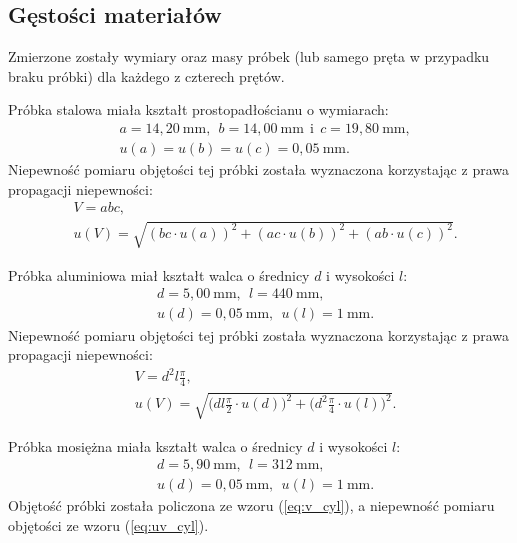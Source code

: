 \documentclass[12pt,a4paper]{article}
\numberwithin{equation}{section}
\begin{document}
\subsection{Gęstości materiałów}

Zmierzone zostały wymiary oraz masy próbek (lub samego pręta w przypadku braku próbki) dla każdego z czterech prętów.

Próbka stalowa miała kształt prostopadłościanu o wymiarach:
\begin{equation}
	\begin{split}
	 	&a = 14,20~\textrm{mm},~~b = 14,00~\textrm{mm}~~\textrm{i}~~c = 19,80~\textrm{mm}, \\
		&u(a) = u(b) = u(c) = 0,05~\textrm{mm}.
	\end{split}
\end{equation}
Niepewność pomiaru objętości tej próbki została wyznaczona korzystając z prawa propagacji niepewności:
\begin{align}
	&V = abc, \\
	&u(V) = \sqrt{(bc\cdot u(a))^2 + (ac\cdot u(b))^2 + (ab\cdot u(c))^2}.
\end{align}

Próbka aluminiowa miał kształt walca o średnicy $d$ i wysokości $l$:
\begin{equation}
	\begin{split}
		&d = 5,00~\textrm{mm},~~l = 440~\textrm{mm},\\
		&u(d) = 0,05~\textrm{mm},~~u(l) = 1~\textrm{mm}.
	\end{split}
\end{equation}
Niepewność pomiaru objętości tej próbki została wyznaczona korzystając z prawa propagacji niepewności:
\begin{align}
&V = d^2 l \frac{\pi }{4},  \label{eq:v_cyl} \\
&u(V) = \sqrt{\Bigg(d l \frac{\pi}{2} \cdot u(d)\Bigg)^2 + \Bigg(d^2 \frac{\pi}{4} \cdot u(l)\Bigg)^2}  \label{eq:uv_cyl}.
\end{align}

Próbka mosiężna miała kształt walca o średnicy $d$ i wysokości $l$:
\begin{equation}
\begin{split}
&d = 5,90~\textrm{mm},~~l = 312~\textrm{mm}, \\
&u(d) = 0,05~\textrm{mm},~~u(l) = 1~\textrm{mm}.
\end{split}
\end{equation}
Objętość próbki została policzona ze wzoru (\ref{eq:v_cyl}), a niepewność pomiaru objętości ze wzoru (\ref{eq:uv_cyl}).
\end{document}
